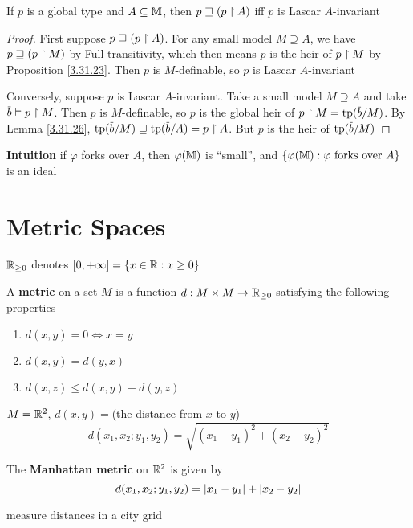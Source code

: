 \documentclass[11pt]{article}
\begin{document}
\begin{proposition}
If \(p\) is a global type and \(A\subseteq\mathbb{M}\), then \(p\sqsupseteq(p\upharpoonright A)\) iff \(p\) is Lascar \(A\)-invariant
\end{proposition}

\begin{proof}
First suppose \(p\sqsupseteq(p\upharpoonright A)\). For any small model \(M\supseteq A\), we have \(p\sqsupseteq(p\upharpoonright M)\) by Full
transitivity, which then means \(p\) is the heir of \(p\upharpoonright M\) by Proposition \ref{3.31.23}.
Then \(p\) is \(M\)-definable, so \(p\) is Lascar \(A\)-invariant

Conversely, suppose \(p\) is Lascar \(A\)-invariant. Take a small model \(M\supseteq A\) and
take \(\barb\vDash p\uhr M\). Then \(p\) is \(M\)-definable, so \(p\) is the global heir
of \(p\uhr M=\tp(\barb/M)\). By Lemma \ref{3.31.26}, \(\tp(\barb/M)\sqsupseteq\tp(\barb/A)=p\uhr A\).
But \(p\) is the heir of \(\tp(\barb/M)\)
\end{proof}


\textbf{Intuition} if \(\varphi\) forks over \(A\), then \(\varphi(\mathbb{M})\) is ``small'', and
\(\{\varphi(\mathbb{M}):\varphi\text{ forks over }A\}\) is an ideal

\appendix
\section{Metric Spaces}
\label{sec:orgf244a45}
\(\mathbb{R}_{\ge 0}\) denotes \([0,+\infty]=\{x\in\mathbb{R}:x\ge 0\}\)
\begin{definition}[]
A \textbf{metric} on a set \(M\) is a function \(d:M\times M\to\mathbb{R}_{\ge 0}\) satisfying the following properties
\begin{enumerate}
\item \(d(x,y)=0\Leftrightarrow x=y\)
\item \(d(x,y)=d(y,x)\)
\item \(d(x,z)\le d(x,y)+d(y,z)\)
\end{enumerate}
\end{definition}

\begin{examplle}[]
\(M=\mathbb{R}^2\), \(d(x,y)=\)(the distance from \(x\) to \(y\))
\begin{equation*}
  d(x_1,x_2;y_1,y_2)=\sqrt{(x_1-y_1)^2+(x_2-y_2)^2}
\end{equation*}
\end{examplle}

\begin{examplle}[]
The \textbf{Manhattan metric} on \(\mathbb{R}^2\) is given by
\begin{equation*}
  d(x_1,x_2;y_1,y_2)=\abs{x_1-y_1}+\abs{x_2-y_2}
\end{equation*}

measure distances in a city grid
\end{examplle}
\end{document}
